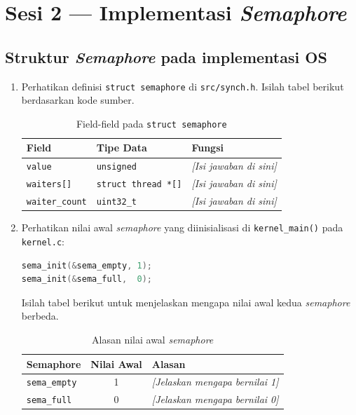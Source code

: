 \section{Sesi 2 — Implementasi \textit{Semaphore}}

\subsection{Struktur \textit{Semaphore} pada implementasi OS}

\begin{enumerate}

	\item Perhatikan definisi \texttt{struct semaphore} di \texttt{src/synch.h}. Isilah tabel berikut berdasarkan kode sumber.

	      \begin{table}[htbp]
		      \centering
		      \caption{Field-field pada \texttt{struct semaphore}}
		      \begin{tabulary}{\textwidth}{|l|l|L|}
			      \hline
			      \textbf{Field} & \textbf{Tipe Data} & \textbf{Fungsi} \\ \hline
			      \texttt{value}         & \texttt{unsigned}           & \textit{[Isi jawaban di sini]} \\ \hline
			      \texttt{waiters[]}     & \texttt{struct thread *[]}  & \textit{[Isi jawaban di sini]} \\ \hline
			      \texttt{waiter\_count} & \texttt{uint32\_t}          & \textit{[Isi jawaban di sini]} \\ \hline
		      \end{tabulary}
	      \end{table}

	\item Perhatikan nilai awal \textit{semaphore} yang diinisialisasi di \texttt{kernel\_main()} pada \texttt{kernel.c}:
	      \begin{lstlisting}[language=C, caption={Inisialisasi \textit{semaphore} di \texttt{kernel\_main()}}]
sema_init(&sema_empty, 1);
sema_init(&sema_full,  0);
    \end{lstlisting}

	      Isilah tabel berikut untuk menjelaskan mengapa nilai awal kedua \textit{semaphore} berbeda.

	      \begin{table}[htbp]
		      \centering
		      \caption{Alasan nilai awal \textit{semaphore}}
		      \begin{tabulary}{\textwidth}{|l|c|L|}
			      \hline
			      \textbf{Semaphore} & \textbf{Nilai Awal} & \textbf{Alasan} \\ \hline
			      \texttt{sema\_empty} & 1 & \textit{[Jelaskan mengapa bernilai 1]} \\ \hline
			      \texttt{sema\_full}  & 0 & \textit{[Jelaskan mengapa bernilai 0]} \\ \hline
		      \end{tabulary}
	      \end{table}

\end{enumerate}

